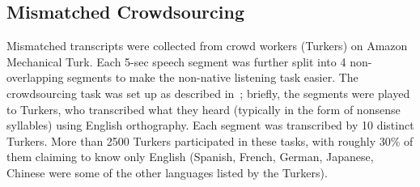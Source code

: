 \subsection{Mismatched Crowdsourcing}
\label{sec:methodsmc}

Mismatched transcripts were collected from crowd workers (Turkers)
on Amazon Mechanical Turk.
Each 5-sec speech segment was further split into 4
non-overlapping segments to make the non-native listening task
easier. The crowdsourcing task was set up as described
in~\cite{JHJ15b}; briefly, the segments were played to Turkers,
who transcribed what they heard (typically in the form of nonsense
syllables) using English orthography. Each segment was
transcribed by 10 distinct Turkers. More than 2500 Turkers
participated in these tasks, with roughly 30\% of them claiming to
know only English (Spanish, French, German, Japanese, Chinese were
some of the other languages listed by the Turkers).

